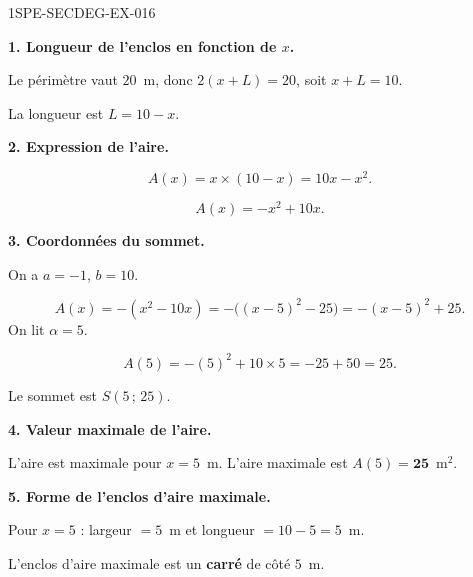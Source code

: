 \begin{corrige}{1SPE-SECDEG-EX-016}

\textbf{1. Longueur de l'enclos en fonction de $x$.}


Le périmètre vaut $20$~m, donc $2(x + L) = 20$, soit $x + L = 10$.

La longueur est $L = 10 - x$.

\medskip
\textbf{2. Expression de l'aire.}


\[A(x) = x \times (10 - x) = 10x - x^2.\]

\[\boxed{A(x) = -x^2 + 10x.}\]

\medskip
\textbf{3. Coordonnées du sommet.}


On a $a = -1$, $b = 10$.

\[A(x)=-(x^2-10x)=-\bigl((x-5)^2-25\bigr)=-(x-5)^2+25.\]
On lit $\alpha=5$.

\[A(5) = -(5)^2 + 10 \times 5 = -25 + 50 = 25.\]

Le sommet est $S(5\,;\,25)$.

\medskip
\textbf{4. Valeur maximale de l'aire.}


L'aire est maximale pour $x = 5$~m. L'aire maximale est $A(5) = \mathbf{25}$~m$^2$.

\medskip
\textbf{5. Forme de l'enclos d'aire maximale.}

Pour $x = 5$ : largeur $= 5$~m et longueur $= 10 - 5 = 5$~m.

L'enclos d'aire maximale est un \textbf{carré} de côté $5$~m.

\end{corrige}
